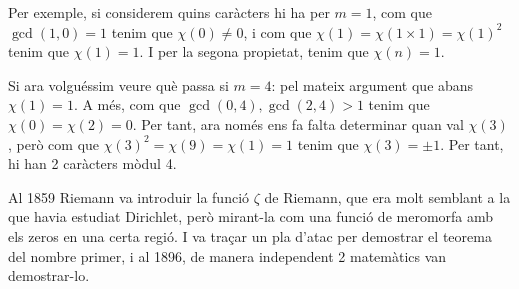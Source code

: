 Per exemple, si considerem quins caràcters hi ha per $m=1$, com que $\gcd(1,0)=1$ tenim que $\chi(0)\neq0$, i com que $\chi(1)=\chi(1\times1)=\chi(1)^2$ tenim que $\chi(1)=1$. I per la segona propietat, tenim que $\chi(n)=1$.\par
Si ara volguéssim veure què passa si $m=4$: pel mateix argument que abans $\chi(1)=1$. A més, com que $\gcd(0,4),\gcd(2,4)>1$ tenim que $\chi(0)=\chi(2)=0$. Per tant, ara només ens fa falta determinar quan val $\chi(3)$, però com que $\chi(3)^2=\chi(9)=\chi(1)=1$ tenim que $\chi(3)=\pm1$. Per tant, hi han 2 caràcters mòdul 4.\par

Al 1859 Riemann va introduir la funció $\zeta$ de Riemann, que era molt semblant a la que havia estudiat Dirichlet, però mirant-la com una funció de meromorfa amb els zeros en una certa regió. I va traçar un pla d'atac per demostrar el teorema del nombre primer, i al 1896, de manera independent 2 matemàtics van demostrar-lo.
